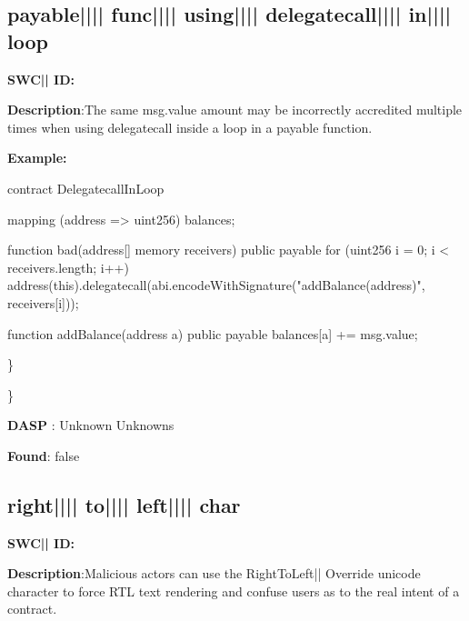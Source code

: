 \documentclass{article}
\begin{document}
\subsection{payable{||\textunderscore|| }func{||\textunderscore|| }using{||\textunderscore|| }delegatecall{||\textunderscore|| }in{||\textunderscore|| }loop} 
\textbf{SWC{|\textunderscore| }ID:} 

\textbf{Description}:The same msg.value amount may be incorrectly accredited multiple times when using delegatecall inside a loop in a payable function.


\textbf{Example:} 
\begin{ffcode} 

contract DelegatecallInLoop{

    mapping (address => uint256) balances;

    function bad(address[] memory receivers) public payable {
        for (uint256 i = 0; i < receivers.length; i++) {
            address(this).delegatecall(abi.encodeWithSignature("addBalance(address)", receivers[i]));
        }
    }

    function addBalance(address a) public payable {
        balances[a] += msg.value;
    }
}

\end{ffcode} 
\} 

\} 

\textbf{DASP} : Unknown Unknowns

\textbf{Found}: false

\subsection{right{||\textunderscore|| }to{||\textunderscore|| }left{||\textunderscore|| }char} 
\textbf{SWC{|\textunderscore| }ID:} 

\textbf{Description}:Malicious actors can use the Right{\textendash}To{\textendash}Left|\textendash| Override unicode character to force RTL text rendering and confuse users as to the real intent of a contract.
\end{document}
